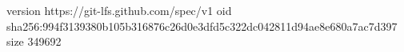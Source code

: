 version https://git-lfs.github.com/spec/v1
oid sha256:994f3139380b105b316876c26d0e3dfd5c322dc042811d94ae8e680a7ac7d397
size 349692
